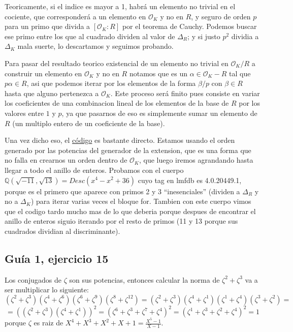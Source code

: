 \documentclass[12pt]{amsart}
\newcommand{\QQ}{\mathbb{Q}}
\newcommand{\OO}{\mathcal{O}}
\newcommand{\lp}{\left(}
\newcommand{\rp}{\right)}
\theoremstyle{plain}
\begin{document}
Teoricamente, si el indice es mayor a 1, habrá un elemento no trivial en el cociente, que corresponderá a un elemento en $\OO_K$ y no en $R$, y seguro de orden $p$ para un primo que divida a $[\OO_K:R]$ por el teorema de Cauchy. Podemos buscar ese primo entre los que al cuadrado dividen al valor de $\Delta_R$; y si justo $p^2$ dividia a $\Delta_K$ mala suerte, lo descartamos y seguimos probando.

Para pasar del resultado teorico existencial de un elemento no trivial en $\OO_K/R$ a construir un elemento en $\OO_K$ y no en $R$ notamos que es un $\alpha \in \OO_K - R$ tal que $p\alpha \in R$, asi que podemos iterar por los elementos de la forma $\beta /p$ con $\beta\in R$ hasta que alguno pertenezca a $\OO_K$. Este proceso será finito pues consiste en variar los coeficientes de una combinacion lineal de los elementos de la base de $R$ por los valores entre $1$ y $p$, ya que pasarnos de eso es simplemente sumar un elemento de $R$ (un multiplo entero de un coeficiente de la base).

Una vez dicho eso, el \hyperref[codigo1]{código} es bastante directo. Estamos usando el orden generado por las potencias del generador de la extension, que es una forma que no falla en crearnos un orden dentro de $\OO_K$, que luego iremos agrandando hasta llegar a todo el anillo de enteros. Probamos con el cuerpo $\QQ(\sqrt{-11}, \sqrt{13}) = Desc(x^4-x^2+36)$ cuyo tag en lmfdb es 4.0.20449.1, porque es el primero que aparece con primos 2 y 3 ``inesenciales'' (dividen a $\Delta_R$ y no a $\Delta_K$) para iterar varias veces el bloque for. Tambien con este cuerpo vimos que el codigo tardo mucho mas de lo que deberia porque despues de encontrar el anillo de enteros siguio iterando por el resto de primos (11 y 13 porque sus cuadrados dividian al discriminante).



\subsection*{Guía 1, ejercicio 15}
Los conjugados de $\zeta$ son sus potencias, entonces calcular la norma
de $\zeta^2+\zeta^3$ va a ser multiplicar lo siguiente:
$$(\zeta^2+\zeta^3)(\zeta^4+\zeta^6)(\zeta^6+\zeta^9)(\zeta^8+\zeta^{12})
= (\zeta^2+\zeta^3)(\zeta^4+\zeta^1)(\zeta^1+\zeta^4)(\zeta^3+\zeta^2)=$$
$$=\lp(\zeta^2+\zeta^3)(\zeta^4+\zeta^1)\rp^2=
(\zeta^6+\zeta^3+\zeta^7+\zeta^4)^2=(\zeta^1+\zeta^3+\zeta^2+\zeta^4)^2=
1$$
porque $\zeta$ es raiz de $X^4+X^3+X^2+X+1 = \frac{X^5-1}{X-1}$.
\end{document}
